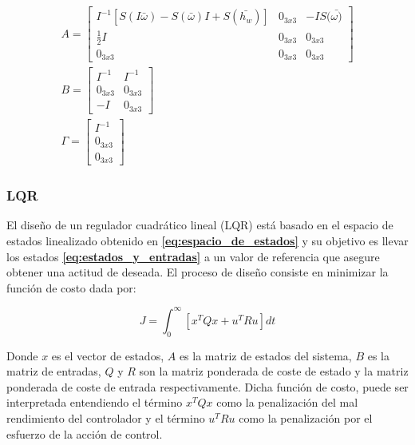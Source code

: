\begin{gather}
	A = \left[\begin{array}{ccc}
		 I^{-1}\left[S(I\bar{\omega})-S(\bar{\omega})I+S(\bar{h_w})\right]& 0_{3x3} & -IS(\bar{\omega)}\\
		\frac{1}{2}I & 0_{3x3} & 0_{3x3} \\
		 0_{3x3}& 0_{3x3} & 0_{3x3}
	\end{array}\right] \label{eq:matrizA}\\[10pt]
	B= \left[\begin{array}{cc}
		I^{-1}&I^{-1}  \\
		0_{3x3}& 0_{3x3}  \\
		-I& 0_{3x3}
	\end{array}\right]\label{eq:matrizB}\\[10pt]			
	\Gamma =\left[\begin{array}{c}
		I^{-1}  \\
		0_{3x3} \\
		0_{3x3}
	\end{array}\right] \label{eq:matrizGamma}				
\end{gather}
 
	


\subsubsection{LQR}
\hfill \break
El diseño de un regulador cuadrático lineal (LQR) está basado en el espacio de estados linealizado obtenido en \textbf{\eqref{eq:espacio_de_estados}} y su objetivo es llevar los estados \textbf{\eqref{eq:estados_y_entradas}} a un valor de referencia que asegure obtener una actitud de deseada. El proceso de diseño consiste en minimizar la función de costo dada por:

\begin{equation}\label{eq:funcion_de_costo}
	J=\int_{0}^{\infty}\left[x^{T}Qx+u^{T}Ru\right]dt
\end{equation}

Donde $x$ es el vector de estados, $A$ es la matriz de estados del sistema, $B$ es la matriz de entradas, $Q$ y $R$ son la matriz ponderada de coste de estado y la matriz ponderada de coste de entrada respectivamente. Dicha función de costo, puede ser interpretada entendiendo el término $x^{T}Qx$ como la penalización del mal rendimiento del controlador y el término $u^{T}Ru$ como la penalización por el esfuerzo de la acción de control. 

